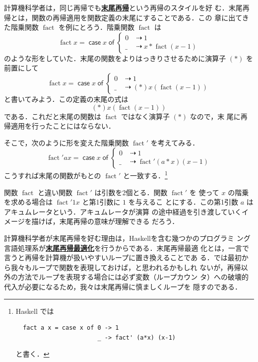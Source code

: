 \documentclass[a5paper,twoside,fleqn,draft]{jsbook}
\newcommand{\programminglanguage}[1]{\textsf{#1}}
\newcommand{\haskell}{\programminglanguage{Haskell}}
\newcommand{\keyword}[1]{{\underline{\textbf{#1}}}}
\newcommand{\mKeyword}[1]{\mathsf{#1}}
\newcommand{\mCaseKeyword}{\mKeyword{case}}
\newcommand{\mOfKeyword}{\mKeyword{of}}
\DeclareMathOperator{\mCaseKW}{\mCaseKeyword}
\DeclareMathOperator{\mOfKW}{\mOfKeyword}
\newcommand{\mSpecialFunc}[1]{#1}
\DeclareMathOperator{\mFact}{\mSpecialFunc{fact}}
\DeclareMathOperator{\mIfSo}{\dashrightarrow}
\newcommand{\mCaseOf}[1]{\mCaseKW#1\mOfKW}
\begin{document}
計算機科学者は，同じ再帰でも\keyword{末尾再帰}という再帰のスタイルを好
む．末尾再帰とは，関数の再帰適用を関数定義の末尾にすることである．この
章に出てきた階乗関数 $\mFact$ を例にとろう．階乗関数 $\mFact$ は
\begin{equation}
  \mFact x
  =\mCaseOf{x}\begin{cases}
    0
    &\mIfSo1\\
    \_
    &\mIfSo x*\mFact(x-1)
  \end{cases}
\end{equation}
のような形をしていた．末尾の関数をよりはっきりさせるために演算子 $(*)$
を前置にして
\begin{equation}
  \mFact x
  =\mCaseOf{x}
  \begin{cases}
    0
    &\mIfSo1\\
    \_
    &\mIfSo(*)x(\mFact(x-1))
  \end{cases}
\end{equation}
と書いてみよう．この定義の末尾の式は
\begin{equation}
  (*)x(\mFact(x-1))
\end{equation}
である．これだと末尾の関数は $\mFact$ ではなく演算子 $(*)$ なので，末
尾に再帰適用を行ったことにはならない．

そこで，次のように形を変えた階乗関数 $\mFact'$ を考えてみる．
\begin{equation}
  \mFact'ax
  =\mCaseOf{x}
  \begin{cases}
    0
    &\mIfSo1\\
    \_
    &\mIfSo\mFact'(a*x)(x-1)
  \end{cases}
\end{equation}
こうすれば末尾の関数がもとの $\mFact'$ と一致する．\footnote{\haskell
  では
\begin{verbatim}
  fact a x = case x of 0 -> 1
                       _ -> fact' (a*x) (x-1)
\end{verbatim}
と書く．}

関数 $\mFact$ と違い関数 $\mFact'$ は引数を2個とる．関数 $\mFact'$ を
使って $x$ の階乗を求める場合は $\mFact'1x$ と第1引数に $1$ を与えるこ
とにする．この第1引数 $a$ はアキュムレータという．アキュムレータが演算
の途中経過を引き渡していくイメージを描けば，末尾再帰の意味が理解できる
だろう．

計算機科学者が末尾再帰を好む理由は，\haskell を含む幾つかのプログラミ
ング言語処理系が\keyword{末尾再帰最適化}を行うからである．末尾再帰最適
化とは，一言で言うと再帰を計算機が扱いやすいループに置き換えることであ
る．では最初から我々もループで関数を表現しておけば，と思われるかもしれ
ないが，再帰以外の方法でループを表現する場合には必ず変数（ループカウン
  タ）への破壊的代入が必要になるため，我々は末尾再帰に慎ましくループを
隠すのである．
\end{document}
